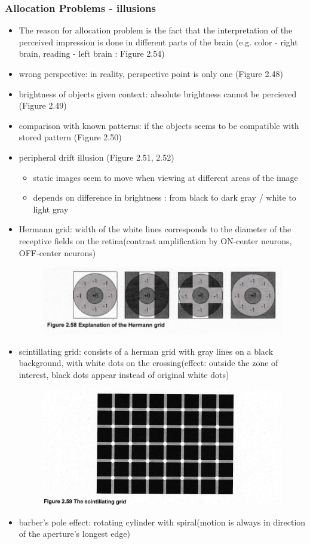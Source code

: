 \documentclass{standalone}
\begin{document}
\subsubsection*{Allocation Problems - illusions}
\begin{itemize}
	\item The reason for allocation problem is the fact that the interpretation of the perceived impression is done in different parts of the brain (e.g. color - right brain, reading - left brain : Figure 2.54)
	\item wrong perspective: in reality, perspective point is only one (Figure 2.48)
	\item brightness of objects given context: absolute brightness cannot be percieved (Figure 2.49)
	\item comparison with known patterns: if the objects seems to be compatible with stored pattern (Figure 2.50)
	\item peripheral drift illusion (Figure 2.51, 2.52)
		\begin{itemize}
			\item static images seem to move when viewing at different areas of the image
			\item depends on difference in brightness : from black to dark gray / white to light gray
		\end{itemize}
	\item Hermann grid: width of the white lines corresponds to the diameter of the receptive fields on the retina(contrast amplification by ON-center neurons, OFF-center neurons)
		\begin{figure}[H]
			\centering
			\includegraphics[width = 0.7\linewidth]{Figures/2_58.png}
		\end{figure}
		\item scintillating grid: consists of a herman grid with gray lines on a black background, with white dots on the crossing(effect: outside the zone of interest, black dots appear instead of original white dots)
		\begin{figure}[H]
			\centering
			\includegraphics[width = 0.7\linewidth]{Figures/2_59.png}
		\end{figure}
		\item barber's pole effect: rotating cylinder with spiral(motion is always in direction of the aperture's longest edge)
\end{itemize}
\end{document}
